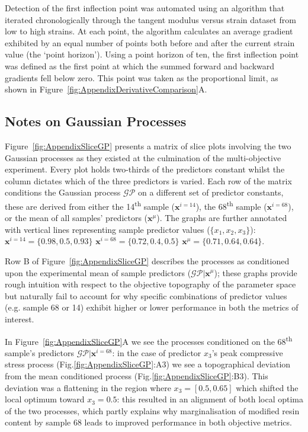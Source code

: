 Detection of the first inflection point was automated using an
 algorithm that iterated chronologically through the tangent modulus versus
 strain dataset from low to high strains.
At each point, the algorithm calculates an average gradient exhibited
 by an equal number of points both before and after the current strain
 value (the `point horizon').
Using a point horizon of ten, the first inflection point was defined as
 the first point at which the summed forward and backward gradients fell
 below zero.
This point was taken as the proportional limit, as shown in 
 Figure~\ref{fig:AppendixDerivativeComparison}A.

\subsection{Notes on Gaussian Processes}
Figure~\ref{fig:AppendixSliceGP} presents a matrix of slice plots involving the two
 Gaussian processes as they existed at the culmination of the multi-objective
 experiment.
Every plot holds two-thirds of the predictors constant whilst the column
 dictates which of the three predictors is varied.
Each row of the matrix conditions the Gaussian process \(\mathcal{GP}\) on a
 different set of predictor constants, these are derived from either the 
 14\textsuperscript{th} sample (\(\mathbf{x}^{i=14}\)), the
 68\textsuperscript{th} sample (\(\mathbf{x}^{i=68}\)), or the
 mean of all samples' predictors (\(\mathbf{x}^{\mu}\)).
The graphs are further annotated with vertical lines representing sample
 predictor values (\(\{x_{1},x_{2},x_{3}\}\)):
 \(\mathbf{x}^{i=14}=\{0.98,0.5,0.93\}\)
 \(\mathbf{x}^{i=68}=\{0.72,0.4,0.5\}\)
 \(\mathbf{x}^{\mu}=\{0.71,0.64,0.64\}\).

Row B of Figure~\ref{fig:AppendixSliceGP} describes the processes as conditioned
 upon the experimental mean of sample predictors
 (\(\mathcal{GP}|\mathbf{x}^{\mu}\)); these graphs provide rough
 intuition with respect to the objective topography of the parameter space
 but naturally fail to account for why specific combinations of
 predictor values (e.g. sample 68 or 14) exhibit higher or lower performance
 in both the metrics of interest.

In Figure~\ref{fig:AppendixSliceGP}A we see the processes conditioned on the
 68\textsuperscript{th} sample's predictors
 \(\mathcal{GP}|\mathbf{x}^{i=68}\): in the case of predictor \(x_{3}\)'s
 peak compressive stress process (Fig.\ref{fig:AppendixSliceGP}:A3) we see a topographical
 deviation from the mean conditioned process (Fig.\ref{fig:AppendixSliceGP}:B3).
This deviation was a flattening in the region where \(x_{3}=[0.5,0.65]\)
 which shifted the local optimum toward \(x_{3}=0.5\): this resulted in an
 alignment of both local optima of the two processes, which partly explains
 why marginalisation of modified resin content by sample 68 leads to improved
 performance in both objective metrics.

